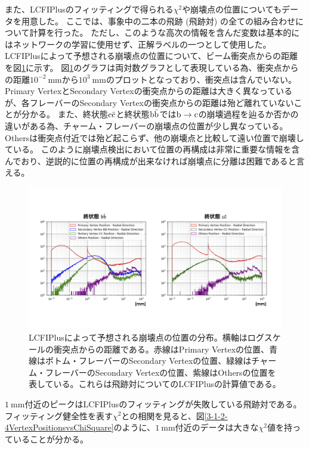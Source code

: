 また、LCFIPlusのフィッティングで得られる$\chi^2$や崩壊点の位置についてもデータを用意した。
ここでは、事象中の二本の飛跡 (飛跡対) の全ての組み合わせについて計算を行った。
ただし、このような高次の情報を含んだ変数は基本的にはネットワークの学習に使用せず、正解ラベルの一つとして使用した。
LCFIPlusによって予想される崩壊点の位置について、ビーム衝突点からの距離を図\ref{3-1-2-3VertexPositions}に示す。
図\ref{3-1-2-3VertexPositions}のグラフは両対数グラフとして表現している為、衝突点からの距離$10^{-2}\ \mathrm{mm}$から$10^{3}\ \mathrm{mm}$のプロットとなっており、衝突点は含んでいない。
Primary VertexとSecondary Vertexの衝突点からの距離は大きく異なっているが、各フレーバーのSecondary Vertexの衝突点からの距離は殆ど離れていないことが分かる。
また、終状態$\rm c\bar{c}$と終状態$\rm b\bar{b}$では$\rm b \to c$の崩壊過程を辿るか否かの違いがある為、チャーム・フレーバーの崩壊点の位置が少し異なっている。
Othersは衝突点付近では殆ど起こらず、他の崩壊点と比較して遠い位置で崩壊している。
このように崩壊点検出において位置の再構成は非常に重要な情報を含んでおり、逆説的に位置の再構成が出来なければ崩壊点に分離は困難であると言える。

\begin{figure}[htbp]
 \centering
 \includegraphics[trim = 50 100 50 150, width=1.0\textwidth, clip]{Figure/3Networks/3-1-2-3VertexPositions.png}
 \caption[LCFIPlusによって予想される崩壊点の位置の分布]{LCFIPlusによって予想される崩壊点の位置の分布。横軸はログスケールの衝突点からの距離である。赤線はPrimary Vertexの位置、青線はボトム・フレーバーのSecondary Vertexの位置、緑線はチャーム・フレーバーのSecondary Vertexの位置、紫線はOthersの位置を表している。これらは飛跡対についてのLCFIPlusの計算値である。}
 \label{3-1-2-3VertexPositions}
\end{figure}

$1\ \mathrm{mm}$付近のピークはLCFIPlusのフィッティングが失敗している飛跡対である。
フィッティング健全性を表す$\chi^2$との相関を見ると、図\ref{3-1-2-4VertexPositionsvsChiSquare}のように、$1\ \mathrm{mm}$付近のデータは大きな$\chi^2$値を持っていることが分かる。

